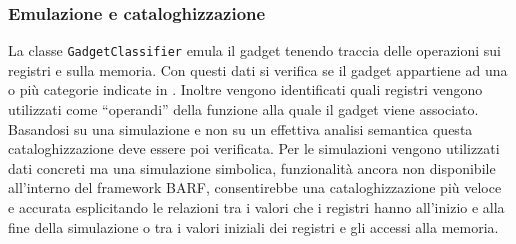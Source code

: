 \subsubsection{Emulazione e cataloghizzazione}
La classe \lstinline{GadgetClassifier} emula il gadget tenendo traccia
delle operazioni sui registri e sulla memoria. Con questi dati si
verifica se il gadget appartiene ad una o più categorie indicate in
\cite{schwartz-2011}. 
Inoltre vengono identificati quali registri vengono utilizzati come
``operandi'' della funzione alla quale il gadget viene
associato. Basandosi su una simulazione e non su un effettiva analisi
semantica questa cataloghizzazione deve essere poi verificata. Per le
simulazioni vengono utilizzati dati concreti ma una simulazione
simbolica, funzionalità ancora non disponibile all'interno del
framework BARF, consentirebbe una cataloghizzazione più veloce e
accurata esplicitando le relazioni tra i valori che i registri hanno
all'inizio e alla fine della simulazione o tra i valori iniziali dei
registri e gli accessi alla memoria.

